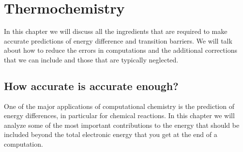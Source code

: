 \documentclass[../Main/chem371-notes.tex]{subfiles}
\begin{document}
\chapter{Thermochemistry}

In this chapter we will discuss all the ingredients that are required to make accurate predictions of energy difference and transition barriers.
We will talk about how to reduce the errors in computations and the additional corrections that we can include and those that are typically neglected.

\section{How accurate is accurate enough?}
One of the major applications of computational chemistry is the prediction of energy differences, in particular for chemical reactions.
In this chapter we will analyze some of the most important contributions to the energy that should be included beyond the total electronic energy that you get at the end of a computation.
\end{document}
